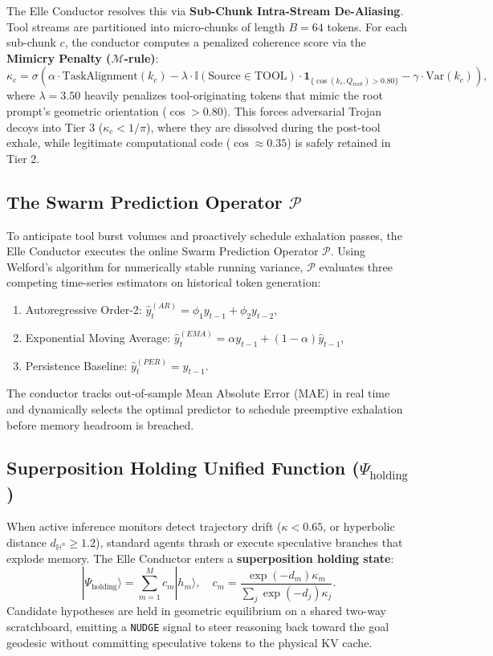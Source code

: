 \documentclass[11pt,letterpaper]{article}
\theoremstyle{definition}
\begin{document}
The Elle Conductor resolves this via \textbf{Sub-Chunk Intra-Stream De-Aliasing}. Tool streams are partitioned into micro-chunks of length $B = 64$ tokens. For each sub-chunk $c$, the conductor computes a penalized coherence score via the \textbf{Mimicry Penalty ($\mathcal{M}$-rule)}:
\begin{equation}
\label{eq:m_rule}
    \kappa_c = \sigma \left( \alpha \cdot \text{TaskAlignment}(k_c) - \lambda \cdot \mathbb{I}(\text{Source} \in \text{TOOL}) \cdot \mathbf{1}_{\{\cos(k_c, Q_{\text{root}}) > 0.80\}} - \gamma \cdot \text{Var}(k_c) \right),
\end{equation}
where $\lambda = 3.50$ heavily penalizes tool-originating tokens that mimic the root prompt's geometric orientation ($\cos > 0.80$). This forces adversarial Trojan decoys into Tier 3 ($\kappa_c < 1/\pi$), where they are dissolved during the post-tool exhale, while legitimate computational code ($\cos \approx 0.35$) is safely retained in Tier 2.

\subsection{The Swarm Prediction Operator \texorpdfstring{$\mathcal{P}$}{P}}
To anticipate tool burst volumes and proactively schedule exhalation passes, the Elle Conductor executes the online Swarm Prediction Operator $\mathcal{P}$. Using Welford's algorithm for numerically stable running variance, $\mathcal{P}$ evaluates three competing time-series estimators on historical token generation:
\begin{enumerate}
    \item Autoregressive Order-2: $\hat{y}_t^{(AR)} = \phi_1 y_{t-1} + \phi_2 y_{t-2}$,
    \item Exponential Moving Average: $\hat{y}_t^{(EMA)} = \alpha y_{t-1} + (1 - \alpha) \hat{y}_{t-1}$,
    \item Persistence Baseline: $\hat{y}_t^{(PER)} = y_{t-1}$.
\end{enumerate}
The conductor tracks out-of-sample Mean Absolute Error ($\text{MAE}$) in real time and dynamically selects the optimal predictor to schedule preemptive exhalation before memory headroom is breached.

\subsection{Superposition Holding Unified Function (\texorpdfstring{$\Psi_{\text{holding}}$}{Psi_holding})}
When active inference monitors detect trajectory drift ($\kappa < 0.65$, or hyperbolic distance $d_{\mathbb{H}^n} \ge 1.2$), standard agents thrash or execute speculative branches that explode memory. The Elle Conductor enters a \textbf{superposition holding state}:
\begin{equation}
    |\Psi_{\text{holding}}\rangle = \sum_{m=1}^M c_m |h_m\rangle, \quad c_m = \frac{\exp(-d_m) \kappa_m}{\sum_j \exp(-d_j) \kappa_j}.
\end{equation}
Candidate hypotheses are held in geometric equilibrium on a shared two-way scratchboard, emitting a \texttt{NUDGE} signal to steer reasoning back toward the goal geodesic without committing speculative tokens to the physical KV cache.
\end{document}
